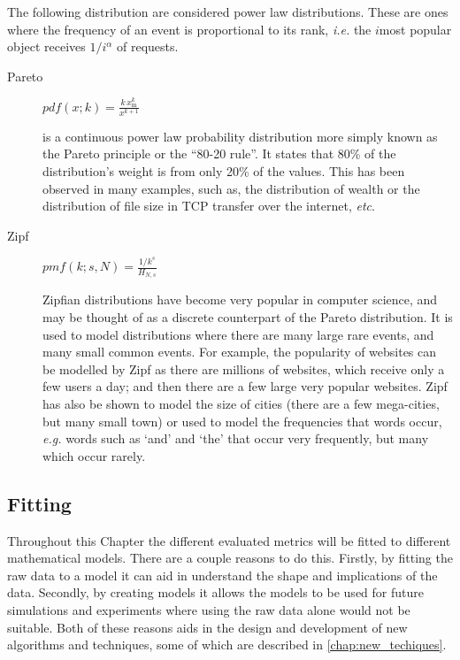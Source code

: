 The following distribution are considered power law distributions. These are ones where the frequency of an event is proportional to its rank, \emph{i.e.} the $i$\sth most popular object receives $1/i^\alpha$ of requests.

\begin{description}
  \item[Pareto] {\Large $pdf(x;k) = \frac{k\,x_\mathrm{m}^k}{x^{k+1}}$}

  is a continuous power law probability distribution more simply known as the Pareto principle or the ``80-20 rule''. It states that 80\% of the distribution's weight is from only 20\% of the values. This has been observed in many examples, such as, the distribution of wealth or the distribution of file size in TCP transfer over the internet, \emph{etc}.

  \item[Zipf] {\Large $pmf(k; s,N) = \frac{1/k^s}{H_{N,s}}$}

  Zipfian distributions have become very popular in computer science, and may be thought of as a discrete counterpart of the Pareto distribution. It is used to model distributions where there are many large rare events, and many small common events. For example, the popularity of websites can be modelled by Zipf as there are millions of websites, which receive only a few users a day; and then there are a few large very popular websites. Zipf has also be shown to model the size of cities (there are a few mega-cities, but many small town) or used to model the frequencies that words occur, \emph{e.g.} words such as `and' and `the' that occur very frequently, but many which occur rarely.
\end{description}

\subsection{Fitting}

Throughout this Chapter the different evaluated metrics will be fitted to different mathematical models. There are a couple reasons to do this. Firstly, by fitting the raw data to a model it can aid in understand the shape and implications of the data. Secondly, by creating models it allows the models to be used for future simulations and experiments where using the raw data alone would not be suitable. Both of these reasons aids in the design and development of new algorithms and techniques, some of which are described in \autoref{chap:new_techiques}.


